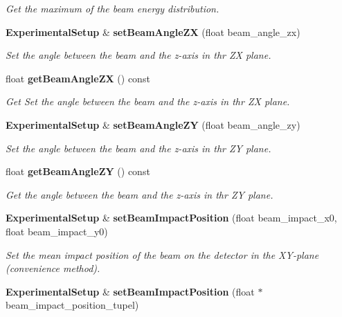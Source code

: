 \begin{DoxyCompactItemize}
\begin{DoxyCompactList}\small\item\em Get the maximum of the beam energy distribution. \end{DoxyCompactList}\item 
{\bf Experimental\-Setup} \& {\bf set\-Beam\-Angle\-Z\-X} (float beam\-\_\-angle\-\_\-zx)\label{classCALICE_1_1ExperimentalSetup_a560946155aed8298f1e27d898674928f}

\begin{DoxyCompactList}\small\item\em Set the angle between the beam and the z-\/axis in thr Z\-X plane. \end{DoxyCompactList}\item 
float {\bf get\-Beam\-Angle\-Z\-X} () const \label{classCALICE_1_1ExperimentalSetup_a135bccef5d9b62b3b30f031eb0c55a3b}

\begin{DoxyCompactList}\small\item\em Get Set the angle between the beam and the z-\/axis in thr Z\-X plane. \end{DoxyCompactList}\item 
{\bf Experimental\-Setup} \& {\bf set\-Beam\-Angle\-Z\-Y} (float beam\-\_\-angle\-\_\-zy)\label{classCALICE_1_1ExperimentalSetup_ad64841d5c4e5f36fae1e2be1f6bf2c37}

\begin{DoxyCompactList}\small\item\em Set the angle between the beam and the z-\/axis in thr Z\-Y plane. \end{DoxyCompactList}\item 
float {\bf get\-Beam\-Angle\-Z\-Y} () const \label{classCALICE_1_1ExperimentalSetup_ad4b57b1e659c5a205c681406e6504992}

\begin{DoxyCompactList}\small\item\em Get the angle between the beam and the z-\/axis in thr Z\-Y plane. \end{DoxyCompactList}\item 
{\bf Experimental\-Setup} \& {\bf set\-Beam\-Impact\-Position} (float beam\-\_\-impact\-\_\-x0, float beam\-\_\-impact\-\_\-y0)\label{classCALICE_1_1ExperimentalSetup_a2fe99a87c6c6f3dcb2bcf00fe50ac620}

\begin{DoxyCompactList}\small\item\em Set the mean impact position of the beam on the detector in the X\-Y-\/plane (convenience method). \end{DoxyCompactList}\item 
{\bf Experimental\-Setup} \& {\bf set\-Beam\-Impact\-Position} (float $\ast$beam\-\_\-impact\-\_\-position\-\_\-tupel)\label{classCALICE_1_1ExperimentalSetup_af81b450d886c0e9857555fb1a9e9222a}


\end{DoxyCompactItemize}
